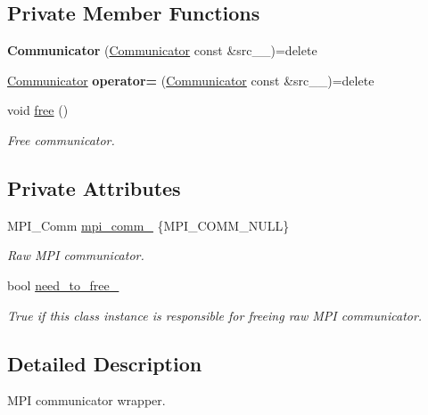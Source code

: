\subsection*{Private Member Functions}
\begin{DoxyCompactItemize}
\item 
\hypertarget{classsddk_1_1_communicator_ab02bbdd3a86d82942c66686a3ff59df2}{}{\bfseries Communicator} (\hyperlink{classsddk_1_1_communicator}{Communicator} const \&src\+\_\+\+\_\+)=delete\label{classsddk_1_1_communicator_ab02bbdd3a86d82942c66686a3ff59df2}

\item 
\hypertarget{classsddk_1_1_communicator_afc50c903a81987f17ff89dc46b6a3772}{}\hyperlink{classsddk_1_1_communicator}{Communicator} {\bfseries operator=} (\hyperlink{classsddk_1_1_communicator}{Communicator} const \&src\+\_\+\+\_\+)=delete\label{classsddk_1_1_communicator_afc50c903a81987f17ff89dc46b6a3772}

\item 
void \hyperlink{classsddk_1_1_communicator_a4c8797749f799a434ff59571e59e7d44}{free} ()
\begin{DoxyCompactList}\small\item\em Free communicator. \end{DoxyCompactList}\end{DoxyCompactItemize}
\subsection*{Private Attributes}
\begin{DoxyCompactItemize}
\item 
M\+P\+I\+\_\+\+Comm \hyperlink{classsddk_1_1_communicator_a33aeacc7ce79d5910f6c31988d07735b}{mpi\+\_\+comm\+\_\+} \{M\+P\+I\+\_\+\+C\+O\+M\+M\+\_\+\+N\+U\+L\+L\}
\begin{DoxyCompactList}\small\item\em Raw M\+P\+I communicator. \end{DoxyCompactList}\item 
bool \hyperlink{classsddk_1_1_communicator_a7dfce793f7d5571fb69dcfac81814403}{need\+\_\+to\+\_\+free\+\_\+}
\begin{DoxyCompactList}\small\item\em True if this class instance is responsible for freeing raw M\+P\+I communicator. \end{DoxyCompactList}\end{DoxyCompactItemize}


\subsection{Detailed Description}
M\+P\+I communicator wrapper. 


